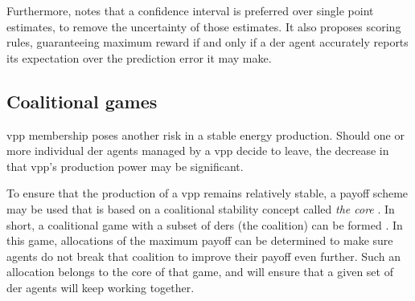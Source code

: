 Furthermore, \cite{RobuKotaChalkiadakisEtAl2012} notes that a confidence interval is preferred over single point estimates, to remove the uncertainty of those estimates. It also proposes scoring rules, guaranteeing maximum reward if and only if a \ac{der} agent accurately reports its expectation over the prediction error it may make.  

\subsection{Coalitional games}
\label{vpp:coalition}
\ac{vpp} membership poses another risk in a stable energy production. Should one or more individual \ac{der} agents managed by a \ac{vpp} decide to leave, the decrease in that \ac{vpp}'s production power may be significant. 

To ensure that the production of a \ac{vpp} remains relatively stable, a payoff scheme may be used that is based on a coalitional stability concept called \emph{the core} \cite{Myerson1991}. In short, a coalitional game with a subset of \acp{der} (the coalition) can be formed \cite{MihailescuVasiraniOssowski2011}. In this game, allocations of the maximum payoff can be determined to make sure agents do not break that coalition to improve their payoff even further\cite{ChalkiadakisRobuKotaEtAl2011, YeungPoonWu1999, SaadHanPoor2011}. Such an allocation belongs to the core of that game, and will ensure that a given set of \ac{der} agents will keep working together.

